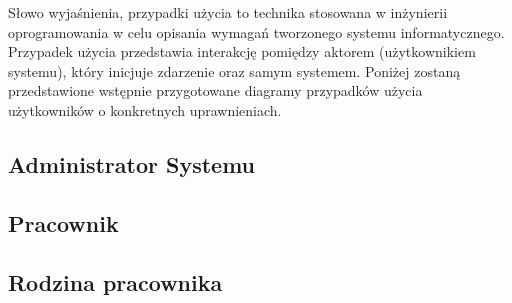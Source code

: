 Słowo wyjaśnienia, przypadki użycia to technika stosowana w inżynierii oprogramowania w celu opisania wymagań tworzonego systemu informatycznego. Przypadek użycia przedstawia interakcję pomiędzy aktorem (użytkownikiem systemu), który inicjuje zdarzenie oraz samym systemem.\newline
Poniżej zostaną przedstawione wstępnie przygotowane diagramy przypadków użycia użytkowników o konkretnych uprawnieniach.

\subsection{Administrator Systemu}
\subsection{Pracownik}
\subsection{Rodzina pracownika}